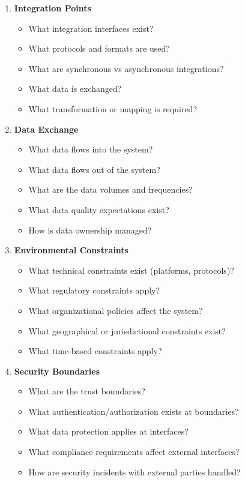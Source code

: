 \documentclass[11pt,letterpaper]{article}
\begin{document}
\begin{enumerate}[label=\textbf{C\arabic*:}, leftmargin=2.5em]
    \item \textbf{Integration Points}
    \begin{itemize}[nosep]
        \item What integration interfaces exist?
        \item What protocols and formats are used?
        \item What are synchronous vs asynchronous integrations?
        \item What data is exchanged?
        \item What transformation or mapping is required?
    \end{itemize}
    
    \item \textbf{Data Exchange}
    \begin{itemize}[nosep]
        \item What data flows into the system?
        \item What data flows out of the system?
        \item What are the data volumes and frequencies?
        \item What data quality expectations exist?
        \item How is data ownership managed?
    \end{itemize}
    
    \item \textbf{Environmental Constraints}
    \begin{itemize}[nosep]
        \item What technical constraints exist (platforms, protocols)?
        \item What regulatory constraints apply?
        \item What organizational policies affect the system?
        \item What geographical or jurisdictional constraints exist?
        \item What time-based constraints apply?
    \end{itemize}
    
    \item \textbf{Security Boundaries}
    \begin{itemize}[nosep]
        \item What are the trust boundaries?
        \item What authentication/authorization exists at boundaries?
        \item What data protection applies at interfaces?
        \item What compliance requirements affect external interfaces?
        \item How are security incidents with external parties handled?
    \end{itemize}
    

\end{enumerate}
\end{document}
